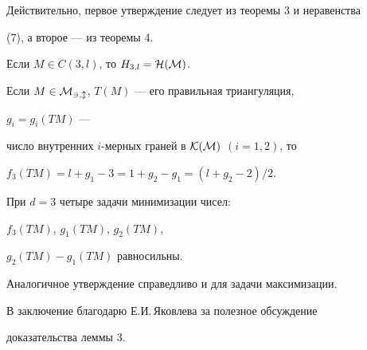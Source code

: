 Действительно, первое утверждение следует из теоремы 3 и неравенства


(7), а второе --- из теоремы 4.





\begin{cor}


Если $M\in C(3,l)$, то $H_{3,l}=\cal H(M)$.


\end{cor}





\begin{thm}


Если $M\in\cal M_{3,l}$, $T(M)$ --- его правильная триангуляция,


$g_i=g_i(TM)$ ---


число внутренних $i$-мерных граней в $\cal K(M)$ $(i=1,2)$, то


$f_3(TM)=l+g_1-3=1+g_2-g_1=(l+g_2-2)/2$.


\end{thm}





\begin{cor}


При $d=3$ четыре задачи минимизации чисел:


$f_3(TM)$, $g_1(TM)$, $g_2(TM)$,


$g_2(TM)-g_1(TM)$ равносильны.


Аналогичное утверждение справедливо и для задачи максимизации.


\end{cor}





В заключение благодарю Е.И.\,Яковлева за полезное обсуждение


доказательства леммы 3.








